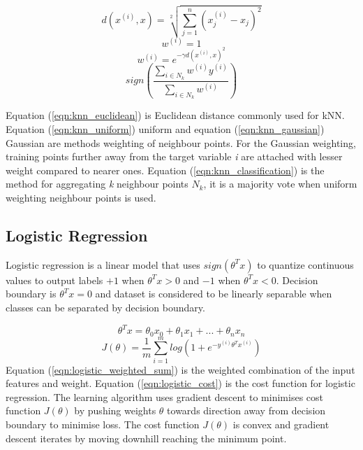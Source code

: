 \documentclass[transmag]{IEEEtran}
\begin{document}
\begin{equation}
\label{eqn:knn_euclidean}
d(x^{(i)},x) = \sqrt[2]{ \sum^n_{j=1} (x^{(i)}_j - x_j)^2 }
\end{equation}
\begin{equation}
\label{eqn:knn_uniform}
w^{(i)} = 1
\end{equation}
\begin{equation}
\label{eqn:knn_gaussian}
w^{(i)} = e^{-\gamma d(x^{(i)},x)^2}
\end{equation}
\begin{equation}
\label{eqn:knn_classification}
sign(\frac{ \sum_{i \in N_k} w^{(i)} y^{(i)} }{ \sum_{ i \in N_k} w^{(i)} })
\end{equation}

\noindent Equation (\ref{eqn:knn_euclidean}) is Euclidean distance commonly used for kNN.
Equation (\ref{eqn:knn_uniform}) uniform and equation (\ref{eqn:knn_gaussian}) Gaussian are methods weighting of neighbour points. For the Gaussian weighting, training points further away from the target variable \emph{i} are attached with lesser weight compared to nearer ones. Equation (\ref{eqn:knn_classification}) is the method for aggregating \emph{k} neighbour points $N_k$, it is a majority vote when uniform weighting neighbour points is used.

\subsection{Logistic Regression}
\noindent Logistic regression is a linear model that uses $sign(\theta^Tx)$ to quantize continuous values to output labels $+1$ when $\theta^Tx > 0$ and $-1$ when $\theta^Tx < 0$. Decision boundary is $\theta^Tx = 0$ and dataset is considered to be linearly separable when classes can be separated by decision boundary. 

\begin{equation}
\label{eqn:logistic_weighted_sum}
\theta^Tx = \theta_0x_0 + \theta_1x_1 + ... + \theta_nx_n
\end{equation}
\begin{equation}
\label{eqn:logistic_cost}
J(\theta) = \frac{1}{m} \sum^m_{i=1} log (1 + e^{-y^{(i)}\theta^Tx^{(i)}})
\end{equation}
\noindent Equation (\ref{eqn:logistic_weighted_sum}) is the weighted combination of the input features and weight. Equation (\ref{eqn:logistic_cost}) is the cost function for logistic regression. The learning algorithm uses gradient descent to minimises cost function $J(\theta)$ by pushing weights $\theta$ towards direction away from decision boundary to minimise loss. The cost function $J(\theta)$ is convex and gradient descent iterates by moving downhill reaching the minimum point.
\end{document}

